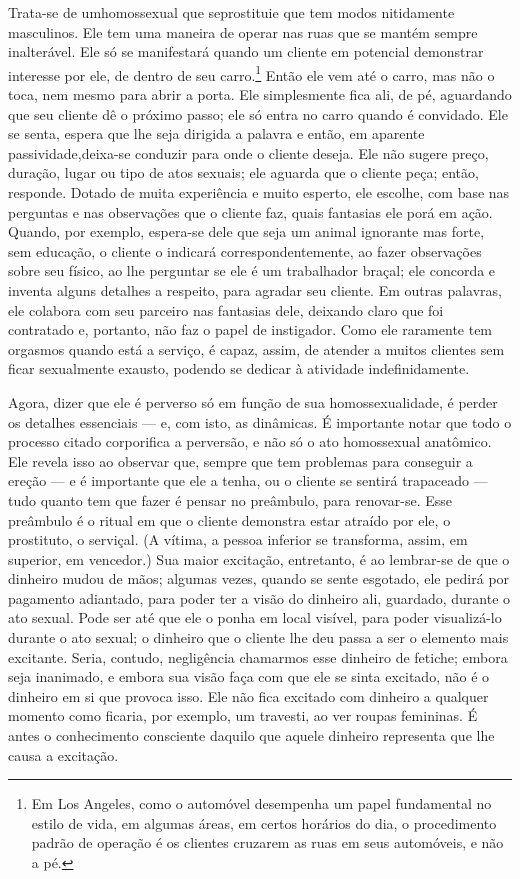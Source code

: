 Trata-se de um\idxprosthom[|(] homossexual que se\idxprost[|(] prostitui\idxhomospros[|(] e que tem modos
nitidamente masculinos. Ele tem uma maneira de operar nas ruas que se
mantém sempre inalterável. Ele só se manifestará quando um cliente
em potencial demonstrar interesse por ele, de dentro de seu carro.\footnote{ Em Los Angeles,
como o automóvel desempenha um papel
fundamental no estilo de vida, em algumas áreas, em certos horários do
dia, o procedimento padrão de operação é os clientes cruzarem as ruas
em seus automóveis, e não a pé.} Então ele vem até o carro, mas não o
toca, nem mesmo para abrir a porta. Ele simplesmente fica ali, de pé,
aguardando que seu cliente dê o próximo passo; ele só entra no carro
quando é convidado. Ele se senta, espera que lhe seja dirigida a
palavra e então, em aparente passividade,\idxprostpas[|(] deixa-se conduzir para onde o
cliente deseja. Ele não sugere preço, duração, lugar ou tipo de atos
sexuais; ele aguarda que o cliente peça; então, responde. Dotado de
muita experiência e muito esperto, ele escolhe, com base nas perguntas
e nas observações que o cliente faz, quais fantasias ele porá em ação.
Quando, por exemplo, espera-se dele que seja um animal ignorante mas
forte, sem educação, o cliente o indicará correspondentemente, ao fazer
observações sobre seu físico, ao lhe perguntar se ele é um trabalhador
braçal; ele concorda e inventa alguns detalhes a respeito, para agradar
 seu cliente. Em outras palavras, ele colabora com seu parceiro nas
fantasias dele, deixando claro que foi contratado e, portanto, não faz
o papel de instigador. Como ele raramente tem orgasmos quando está a
serviço, é capaz, assim, de atender a muitos clientes sem ficar
sexualmente exausto, podendo se dedicar à atividade indefinidamente.

Agora, dizer que ele é perverso só em função de sua
homossexualidade, é perder os detalhes essenciais --- e, com isto, as
dinâmicas. É importante notar que todo o processo citado corporifica a
perversão, e não só o ato homossexual anatômico. Ele revela isso ao
observar que, sempre que tem problemas para conseguir a ereção --- e é
importante que ele a tenha, ou o cliente se sentirá trapaceado ---
tudo quanto tem que fazer é pensar no preâmbulo, para renovar-se.\idxpreli{} Esse
preâmbulo é o ritual em que o cliente demonstra estar atraído por ele,
o prostituto, o serviçal. (A vítima, a pessoa inferior se transforma,
assim, em superior, em vencedor.) Sua maior excitação, entretanto, é ao
lembrar-se de que o dinheiro mudou de mãos; algumas vezes, quando se
sente esgotado, ele pedirá por pagamento adiantado, para poder ter a
visão do dinheiro ali, guardado, durante o ato sexual. Pode ser até
que ele o ponha em local visível, para poder visualizá-lo durante o
ato sexual; o dinheiro que o cliente lhe deu passa a ser o elemento
mais excitante. Seria, contudo, negligência chamarmos esse dinheiro de
fetiche; embora seja inanimado, e embora sua visão faça com que ele se
sinta excitado, não é o dinheiro em si que provoca isso. Ele não fica
excitado com dinheiro a qualquer momento como ficaria, por exemplo, um
travesti, ao ver roupas femininas. É antes o conhecimento consciente
daquilo que aquele dinheiro representa que lhe causa a excitação.

